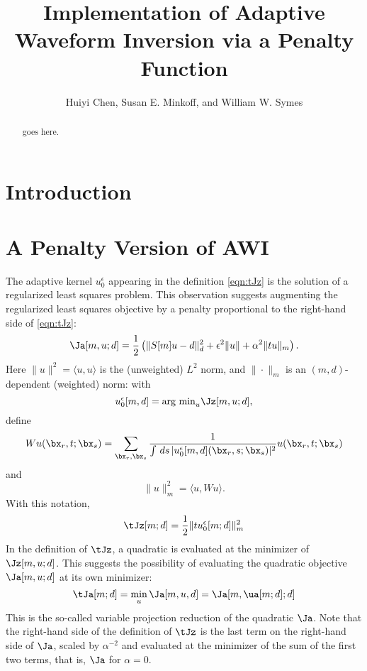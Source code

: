 \title{Implementation of Adaptive Waveform Inversion via a Penalty Function}
\author{Huiyi Chen, Susan E. Minkoff, and William W. Symes}

\begin{abstract}
goes here.
\end{abstract}

\section{Introduction}
\section{A Penalty Version of AWI}
The adaptive kernel $u_0^{\epsilon}$ appearing in the definition \ref{eqn:tJz} is the solution of a regularized least squares problem. This observation suggests augmenting the regularized least squares objective by a penalty proportional to the right-hand side of \ref{eqn:tJz}:
\begin{equation}
  \label{eqn:Ja}
  \Ja[m,u;d] = \frac{1}{2}\left(\|S[m]u-d\|_d^2 + \epsilon^2\|u\| + \alpha^2\|tu\|_m\right).
\end{equation}
Here $\|u\|^2 = \langle u, u \rangle$ is the (unweighted) $L^2$ norm, and $\|\cdot\|_m$ is an $(m,d)$-dependent (weighted) norm: with
\[
  u_0^{\epsilon}[m,d] = \mbox{arg min}_u \Jz[m,u;d],
\]
define
\[
  Wu (\bx_r,t;\bx_s) = \sum_{\bx_r,\bx_s}\frac{1}
  {\int\,ds\,|u_0^{\epsilon}[m,d](\bx_r,s;\bx_s)|^2}u(\bx_r,t;\bx_s)
\]
and
\begin{equation}
  \label{eqn:defmnorm}
  \|u\|^2_m = \langle u, W u \rangle.
\end{equation}
With this notation,
\[
  \tJz[m;d] = \frac{1}{2}\|tu^{\epsilon}_0[m;d]\|^2_m
\]
In the definition of $\tJz$, a quadratic is evaluated at the minimizer of $\Jz[m,u;d]$. This suggests the possibility of evaluating the quadratic objective $\Ja[m,u;d]$ at its own minimizer:
\begin{equation}
  \label{eqn:tJa}
  \tJa[m;d] = \min_u \Ja[m,u,d] = \Ja[m,\ua[m;d];d]
\end{equation}
This is the so-called variable projection reduction of the quadratic $\Ja$.
Note that the right-hand side of the definition of $\tJz$ is the last term on the right-hand side of $\Ja$, scaled by $\alpha^{-2}$ and evaluated at the minimizer of the sum of the first two terms, that is, $\Ja$ for $\alpha=0$.

